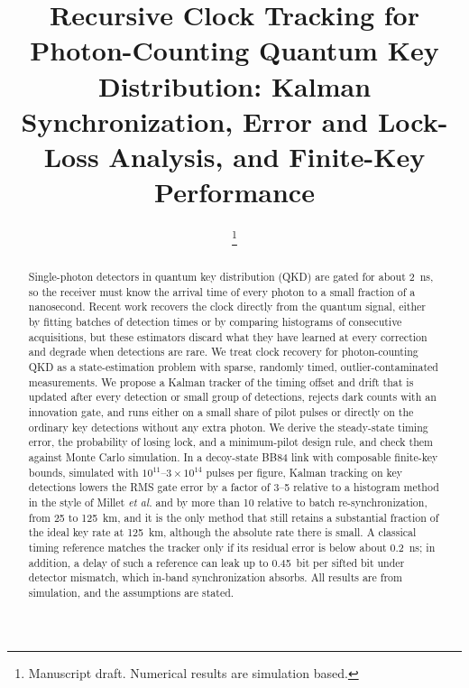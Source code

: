 \documentclass[journal]{IEEEtran}
\theoremstyle{plain}
\begin{document}
\title{Recursive Clock Tracking for Photon-Counting Quantum Key Distribution: Kalman Synchronization, Error and Lock-Loss Analysis, and Finite-Key Performance}

\author{
%
\thanks{Manuscript draft. Numerical results are simulation based.}}

\maketitle

\begin{abstract}
Single-photon detectors in quantum key distribution (QKD) are gated for about 2~ns, so the receiver must know the arrival time of every photon to a small fraction of a nanosecond. Recent work recovers the clock directly from the quantum signal, either by fitting batches of detection times or by comparing histograms of consecutive acquisitions, but these estimators discard what they have learned at every correction and degrade when detections are rare. We treat clock recovery for photon-counting QKD as a state-estimation problem with sparse, randomly timed, outlier-contaminated measurements. We propose a Kalman tracker of the timing offset and drift that is updated after every detection or small group of detections, rejects dark counts with an innovation gate, and runs either on a small share of pilot pulses or directly on the ordinary key detections without any extra photon. We derive the steady-state timing error, the probability of losing lock, and a minimum-pilot design rule, and check them against Monte Carlo simulation. In a decoy-state BB84 link with composable finite-key bounds, simulated with $10^{11}$--$3\times10^{14}$ pulses per figure, Kalman tracking on key detections lowers the RMS gate error by a factor of 3--5 relative to a histogram method in the style of Millet \emph{et al.} and by more than 10 relative to batch re-synchronization, from 25 to 125~km, and it is the only method that still retains a substantial fraction of the ideal key rate at 125~km, although the absolute rate there is small. A classical timing reference matches the tracker only if its residual error is below about 0.2~ns; in addition, a delay of such a reference can leak up to 0.45~bit per sifted bit under detector mismatch, which in-band synchronization absorbs. All results are from simulation, and the assumptions are stated.
\end{abstract}
\end{document}

